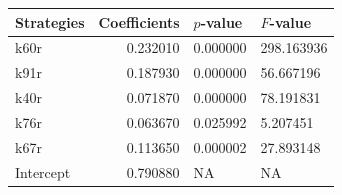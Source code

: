 \begin{tabular}{lrll}
\toprule
Strategies & Coefficients & $p$-value & $F$-value \\
\midrule
k60r & 0.232010 & 0.000000 & 298.163936 \\
k91r & 0.187930 & 0.000000 & 56.667196 \\
k40r & 0.071870 & 0.000000 & 78.191831 \\
k76r & 0.063670 & 0.025992 & 5.207451 \\
k67r & 0.113650 & 0.000002 & 27.893148 \\
Intercept & 0.790880 & NA & NA \\
\bottomrule
\end{tabular}
